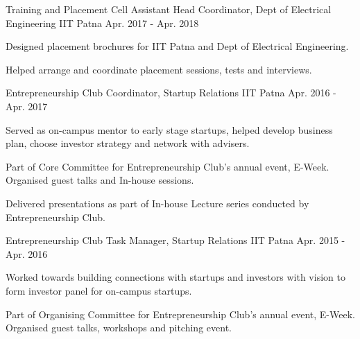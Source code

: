 
\begin{cventries}

\cventry
	{Training and Placement Cell} %
	{Assistant Head Coordinator, Dept of Electrical Engineering} %
	{IIT Patna} %
	{Apr. 2017 - Apr. 2018} %
	{\begin{cvitems} %
		\item {Designed placement brochures for IIT Patna and Dept of Electrical Engineering.}
		\item {Helped arrange and coordinate placement sessions, tests and interviews.}
	\end{cvitems}}

\cventry
	{Entrepreneurship Club} %
	{Coordinator, Startup Relations} %
	{IIT Patna} %
	{Apr. 2016 - Apr. 2017} %
	{\begin{cvitems} %
		\item {Served as on-campus mentor to early stage startups, helped develop business plan, choose investor strategy and network with advisers.}
		\item {Part of Core Committee for Entrepreneurship Club's annual event, E-Week. Organised guest talks and In-house sessions.}
		\item {Delivered presentations as part of In-house Lecture series conducted by Entrepreneurship Club.}
	\end{cvitems}}

\cventry
	{Entrepreneurship Club} %
	{Task Manager, Startup Relations} %
	{IIT Patna} %
	{Apr. 2015 - Apr. 2016} %
	{\begin{cvitems} %
		\item {Worked towards building connections with startups and investors with vision to form investor panel for on-campus startups.}
		\item {Part of Organising Committee for Entrepreneurship Club's annual event, E-Week. Organised guest talks, workshops and pitching event.}
	\end{cvitems}}

\end{cventries}
